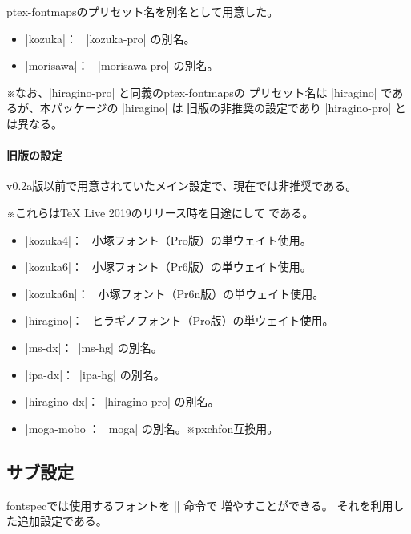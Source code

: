 \documentclass[xelatex,ja=standard,a4paper]{bxjsarticle}
\newcommand{\Pkg}[1]{\textsf{#1}}
\newcommand{\Note}{\par\noindent ※}
\newcommand{\Means}{：\ }
\begin{document}
\Pkg{ptex-fontmaps}のプリセット名を別名として用意した。

\begin{itemize}
\item |kozuka|\Means
  |kozuka-pro| の別名。%
\item |morisawa|\Means
  |morisawa-pro| の別名。%
\end{itemize}

\Note なお、|hiragino-pro| と同義の\Pkg{ptex-fontmaps}の
プリセット名は |hiragino| であるが、本パッケージの |hiragino| は
旧版の非推奨の設定であり |hiragino-pro| とは異なる。

\paragraph{旧版の設定}

v0.2a版以前で用意されていたメイン設定で、現在では非推奨である。

\Note これらは{\TeX} Live 2019のリリース時を目途にして
である。

\begin{itemize}
\item |kozuka4|\Means
  小塚フォント（Pro版）の単ウェイト使用。
\item |kozuka6|\Means
  小塚フォント（Pr6版）の単ウェイト使用。
\item |kozuka6n|\Means
  小塚フォント（Pr6n版）の単ウェイト使用。
\item |hiragino|\Means
  ヒラギノフォント（Pro版）の単ウェイト使用。
\item |ms-dx|\Means |ms-hg| の別名。
\item |ipa-dx|\Means |ipa-hg| の別名。
\item |hiragino-dx|\Means |hiragino-pro| の別名。
\item |moga-mobo|\Means |moga| の別名。※\Pkg{pxchfon}互換用。
\end{itemize}

\subsection{サブ設定}

\Pkg{fontspec}では使用するフォントを |\newfontfamily| 命令で
増やすことができる。
それを利用した追加設定である。
\end{document}
